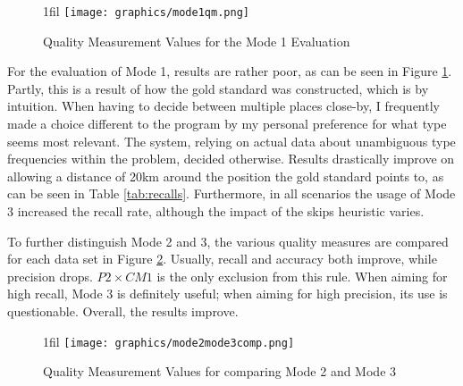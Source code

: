 \documentclass[11pt]{article}
\makeatletter
\newcommand*{\centerfloat}{
  \parindent \z@
  \leftskip \z@ \@plus 1fil \@minus \textwidth
  \rightskip\leftskip
  \parfillskip \z@skip}
\makeatother
\begin{document}
\begin{figure}[htb!]
  \centerfloat
    \texttt{[image: graphics/mode1qm.png]}
  \caption{Quality Measurement Values for the Mode 1 Evaluation}
  \label{fig:mode1qm}
\end{figure}

For the evaluation of Mode 1, results are rather poor, as can be seen in Figure \ref{fig:mode1qm}. Partly, this is a result of how the gold standard was constructed, which is by intuition. When having to decide between multiple places close-by, I frequently made a choice different to the program by my personal preference for what type seems most relevant. The system, relying on actual data about unambiguous type frequencies within the problem, decided otherwise. Results drastically improve on allowing a distance of 20km around the position the gold standard points to, as can be seen in Table \ref{tab:recalls}. Furthermore, in all scenarios the usage of Mode 3 increased the recall rate, although the impact of the skips heuristic varies.


To further distinguish Mode 2 and 3, the various quality measures are compared for each data set in Figure \ref{fig:mode2mode3comp}. Usually, recall and accuracy both improve, while precision drops. $P2\times CM1$ is the only exclusion from this rule. When aiming for high recall, Mode 3 is definitely useful; when aiming for high precision, its use is questionable. Overall, the results improve.

\begin{figure}[htb!]
  \centerfloat
    \texttt{[image: graphics/mode2mode3comp.png]}
  \caption{Quality Measurement Values for comparing Mode 2 and Mode 3}
  \label{fig:mode2mode3comp}
\end{figure}
\end{document}

